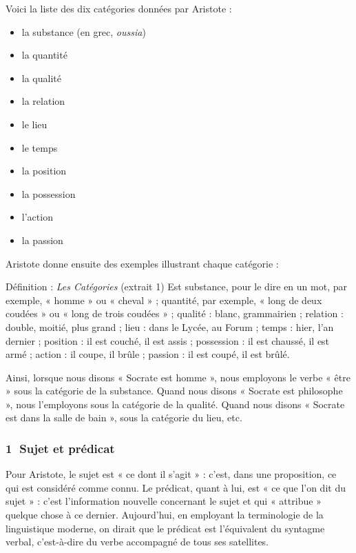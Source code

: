 Voici la liste des dix catégories données par Aristote :
\begin{itemize}
\item la substance (en grec, \textit{oussia})
\item la quantité
\item la qualité
\item la relation
\item le lieu
\item le temps
\item la position
\item la possession
\item l’action
\item la passion
\end{itemize}
Aristote donne ensuite des exemples illustrant chaque catégorie :

\begin{lecture}{Définition : \textit{Les Catégories} (extrait 1)}
Est substance, pour le dire en un mot, par exemple, « homme » ou « cheval » ; quantité, par exemple, « long de deux coudées » ou « long de trois coudées » ; qualité : blanc, grammairien ; relation : double, moitié, plus grand ; lieu : dans le Lycée, au Forum ; temps : hier, l’an dernier ; position : il est couché, il est assis ; possession : il est chaussé, il est armé ; action : il coupe, il brûle ; passion : il est coupé, il est brûlé.
\end{lecture}

Ainsi, lorsque nous disons « Socrate est homme », nous employons le verbe « être » sous la catégorie de la substance. Quand nous disons « Socrate est philosophe », nous l’employons sous la catégorie de la qualité. Quand nous disons « Socrate est dans la salle de bain », sous la catégorie du lieu, etc.

\subsubsection*{\textcircled{\scriptsize 1} Sujet et prédicat}
Pour Aristote, le sujet est « ce dont il s’agit » : c’est, dans une proposition, ce qui est considéré comme connu. Le prédicat, quant à lui, est « ce que l’on dit du sujet » : c’est l’information nouvelle concernant le sujet et qui « attribue » quelque chose à ce dernier. Aujourd’hui, en employant la terminologie de la linguistique moderne, on dirait que le prédicat est l’équivalent du syntagme verbal, c’est-à-dire du verbe accompagné de tous ses satellites.

